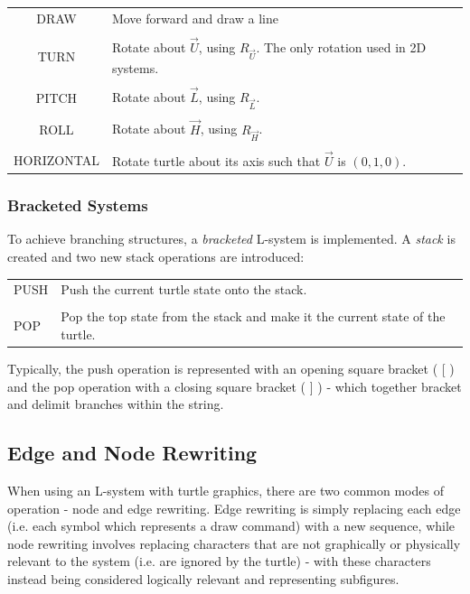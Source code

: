 \documentclass[12pt]{article}
\begin{document}
\begin{center}
\begin{tabular}{c p{8cm}}
DRAW& Move forward and draw a line \\\\
TURN& Rotate about \(\vec{U}\), using \(R_{\vec{U}}\). The only rotation used in 2D systems.\\\\
PITCH&Rotate about \(\vec{L}\), using \(R_{\vec{L}}\). \\\\
ROLL&Rotate about \(\vec{H}\), using \(R_{\vec{H}}\). \\\\
HORIZONTAL&Rotate turtle about its axis such that \(\vec{U}\) is \((0,1,0)\).
\end{tabular}
\end{center}

\subsubsection{Bracketed Systems}
To achieve branching structures, a \textit{bracketed} L-system is implemented. A \textit{stack} is created and two new stack operations are introduced:\\

\begin{center}
\begin{tabular}{l p{8cm}}
PUSH& Push the current turtle state onto the stack.\\\\
POP& Pop the top state from the stack and make it the current state of the turtle.
\end{tabular}
\end{center}
Typically, the push operation is represented with an opening square bracket ( [ ) and the pop operation with a closing square bracket ( ] ) - which together bracket and delimit branches within the string.
\subsection{Edge and Node Rewriting}
When using an L-system with turtle graphics, there are two common modes of operation - node and edge rewriting.  Edge rewriting is simply replacing each edge (i.e. each symbol which represents a draw command) with a new sequence, while node rewriting involves replacing characters that are not graphically or physically relevant to the system (i.e. are ignored by the turtle) - with these characters instead being considered logically relevant and representing subfigures.
\end{document}
